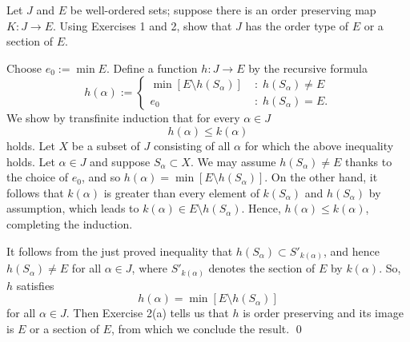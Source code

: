 \documentclass[a4paper,12pt]{article}
\begin{document}
\begin{exe}
	Let \( J \) and \( E \) be well-ordered sets;
	suppose there is an order preserving map
	\( K: J\to E \).
	Using Exercises 1 and 2,
	show that \( J \) has the order type of \( E \) or a section of \( E \).
\end{exe}
\begin{sol}
	Choose \( e_0:=\min{E} \).
	Define a function \( h:J\to E\) by the recursive formula
	\begin{equation*}
		h(\alpha):=\begin{cases}
			\min{\left[ E \setminus h(S_{\alpha}) \right]}
			    & \;\mathrm{:}\;h(S_{\alpha}) \neq E \\
			e_0 & \;\mathrm{:}\;h(S_{\alpha}) = E.
		\end{cases}
	\end{equation*}
	We show by transfinite induction that for every \( \alpha \in J \)
	\begin{equation*}
		h(\alpha) \le k(\alpha)
	\end{equation*}
	holds.
	Let \( X \) be a subset of \( J \) consisting of all \( \alpha \) for which the above inequality holds.
	Let \( \alpha \in J \) and suppose \( S_{\alpha} \subset X \).
	We may assume \( h(S_{\alpha}) \neq E \)
	thanks to the choice of \( e_0 \),
	and so \( h(\alpha) = \min{\left[ E \setminus h(S_{\alpha}) \right]} \).
	On the other hand, it follows that \( k(\alpha) \) is greater than every element of
	\( k(S_{\alpha}) \) and \( h(S_{\alpha}) \) by assumption,
	which leads to \( k({\alpha}) \in E \setminus h(S_{\alpha}) \).
	Hence, \( h(\alpha) \le k(\alpha) \),
	completing the induction.
	
	It follows from the just proved inequality that
	\( h(S_{\alpha}) \subset S'_{k(\alpha)} \),
	and hence
	\( h(S_{\alpha}) \neq E \)
	for all \( \alpha \in J \),
	where
	\( S'_{k(\alpha)} \) denotes the section of \( E \) by \( k(\alpha) \).
	So, \( h \) satisfies 
	\begin{equation*}
		h(\alpha) = \min{\left[ E \setminus h(S_{\alpha}) \right]}
	\end{equation*}
	for all \( \alpha \in J \).
	Then Exercise 2(a) tells us that \( h \) is order preserving and its image is \( E \)
	or a section of \( E \),
	from which we conclude the result.
	\qed\end{sol}
\end{document}
